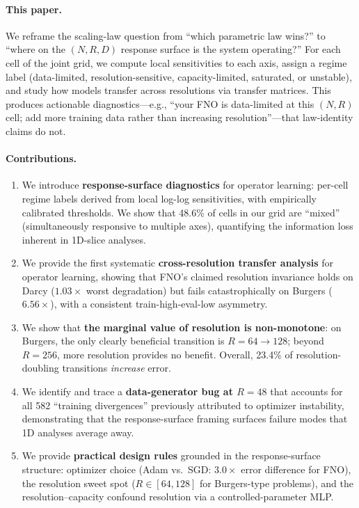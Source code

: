 \documentclass[11pt]{article}
\newcommand{\fnoWorstDeg}{6.56}
\newcommand{\darcyFnoWorstDeg}{1.03}
\newcommand{\sgdFnoRatio}{3.0}
\begin{document}
\paragraph{This paper.}
We reframe the scaling-law question from ``which parametric law
wins?'' to ``where on the $(N, R, D)$ response surface is the
system operating?'' For each cell of the joint grid, we compute
local sensitivities to each axis, assign a regime label
(data-limited, resolution-sensitive, capacity-limited, saturated,
or unstable), and study how models transfer across resolutions via
transfer matrices. This produces actionable diagnostics---e.g.,
``your FNO is data-limited at this $(N, R)$ cell; add more training
data rather than increasing resolution''---that law-identity claims
do not.

\paragraph{Contributions.}
\begin{enumerate}
  \item We introduce \textbf{response-surface diagnostics} for
    operator learning: per-cell regime labels derived from local
    log-log sensitivities, with empirically calibrated thresholds.
    We show that 48.6\% of cells in our grid are ``mixed''
    (simultaneously responsive to multiple axes), quantifying the
    information loss inherent in 1D-slice analyses.
  \item We provide the first systematic \textbf{cross-resolution
    transfer analysis} for operator learning, showing that FNO's
    claimed resolution invariance holds on Darcy
    ($\darcyFnoWorstDeg{\times}$ worst degradation) but fails
    catastrophically on Burgers ($\fnoWorstDeg{\times}$), with a
    consistent train-high-eval-low asymmetry.
  \item We show that \textbf{the marginal value of resolution is
    non-monotone}: on Burgers, the only clearly beneficial
    transition is $R{=}64 \to 128$; beyond $R{=}256$, more
    resolution provides no benefit. Overall, 23.4\% of
    resolution-doubling transitions \emph{increase} error.
  \item We identify and trace a \textbf{data-generator bug at
    $R{=}48$} that accounts for all 582 ``training divergences''
    previously attributed to optimizer instability, demonstrating
    that the response-surface framing surfaces failure modes that
    1D analyses average away.
  \item We provide \textbf{practical design rules} grounded in the
    response-surface structure: optimizer choice (Adam vs.\ SGD:
    $\sgdFnoRatio{\times}$ error difference for FNO), the
    resolution sweet spot ($R \in [64, 128]$ for Burgers-type
    problems), and the resolution--capacity confound resolution
    via a controlled-parameter MLP.
\end{enumerate}
\end{document}
